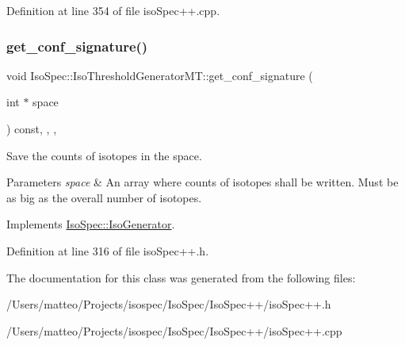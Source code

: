 Definition at line 354 of file iso\+Spec++.\+cpp.

\mbox{\label{class_iso_spec_1_1_iso_threshold_generator_m_t_a7c398ea67338f0d446de73ec6670dbf5}} 
\subsubsection{\texorpdfstring{get\+\_\+conf\+\_\+signature()}{get\_conf\_signature()}}
{\footnotesize\ttfamily void Iso\+Spec\+::\+Iso\+Threshold\+Generator\+M\+T\+::get\+\_\+conf\+\_\+signature (\begin{DoxyParamCaption}\item[{int $\ast$}]{space }\end{DoxyParamCaption}) const\hspace{0.3cm}{\ttfamily [inline]}, {\ttfamily [final]}, {\ttfamily [override]}, {\ttfamily [virtual]}}



Save the counts of isotopes in the space. 


\begin{DoxyParams}{Parameters}
{\em space} & An array where counts of isotopes shall be written. Must be as big as the overall number of isotopes. \\
\hline
\end{DoxyParams}


Implements \mbox{\hyperlink{class_iso_spec_1_1_iso_generator_a19ca8af7dd97f8f37756d4267d49d91d}{Iso\+Spec\+::\+Iso\+Generator}}.



Definition at line 316 of file iso\+Spec++.\+h.



The documentation for this class was generated from the following files\+:\begin{DoxyCompactItemize}
\item 
/\+Users/matteo/\+Projects/isospec/\+Iso\+Spec/\+Iso\+Spec++/iso\+Spec++.\+h\item 
/\+Users/matteo/\+Projects/isospec/\+Iso\+Spec/\+Iso\+Spec++/iso\+Spec++.\+cpp\end{DoxyCompactItemize}
